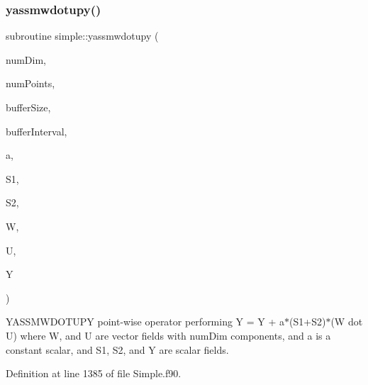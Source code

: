 \subsubsection{\texorpdfstring{yassmwdotupy()}{yassmwdotupy()}}
{\footnotesize\ttfamily subroutine simple\+::yassmwdotupy (\begin{DoxyParamCaption}\item[{integer(kind=4), intent(in)}]{num\+Dim,  }\item[{integer(kind=8), intent(in)}]{num\+Points,  }\item[{integer(kind=8), dimension(numdim), intent(in)}]{buffer\+Size,  }\item[{integer(kind=8), dimension(2$\ast$numdim), intent(in)}]{buffer\+Interval,  }\item[{real(kind=8), intent(in)}]{a,  }\item[{real(kind=8), dimension(numpoints), intent(in)}]{S1,  }\item[{real(kind=8), dimension(numpoints), intent(in)}]{S2,  }\item[{real(kind=8), dimension(numdim$\ast$numpoints), intent(in)}]{W,  }\item[{real(kind=8), dimension(numdim$\ast$numpoints), intent(in)}]{U,  }\item[{real(kind=8), dimension(numpoints), intent(inout)}]{Y }\end{DoxyParamCaption})}



Y\+A\+S\+S\+M\+W\+D\+O\+T\+U\+PY point-\/wise operator performing Y = Y + a$\ast$(S1+\+S2)$\ast$(W dot U) where W, and U are vector fields with num\+Dim components, and a is a constant scalar, and S1, S2, and Y are scalar fields. 



Definition at line 1385 of file Simple.\+f90.

\hypertarget{namespacesimple_ae052725aabe2937b940c96be18e975d9}{}\label{namespacesimple_ae052725aabe2937b940c96be18e975d9} 
